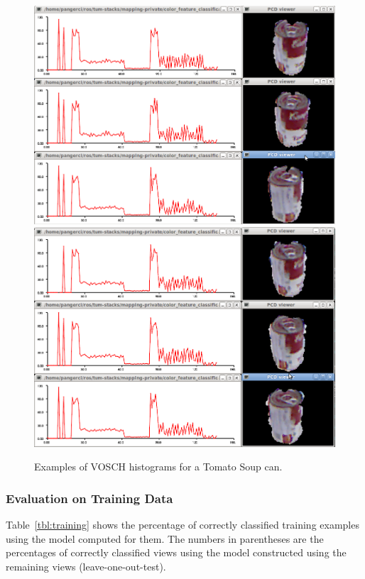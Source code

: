 \documentclass[conference]{sty/IEEEtran}
\begin{document}
\begin{figure}[htb!]
  \begin{center}
    \includegraphics[width=.9\columnwidth]{figures/colorCHLAC/real/tomato/tomato_hist_pcd.png}
    \includegraphics[width=.9\columnwidth]{figures/colorCHLAC/real/tomato/tomato_hist_pcd2.png}
    \caption{Examples of  VOSCH histograms for a Tomato Soup can.}
    \label{fig:grsd_colorchlac_tomato}
  \end{center}
\end{figure}


\subsubsection{Evaluation on Training Data}
Table~\ref{tbl:training} shows the percentage of correctly classified training examples using the model computed for them.
The numbers in parentheses are the percentages of correctly classified views using the model constructed using the remaining views
(leave-one-out-test).
\end{document}

